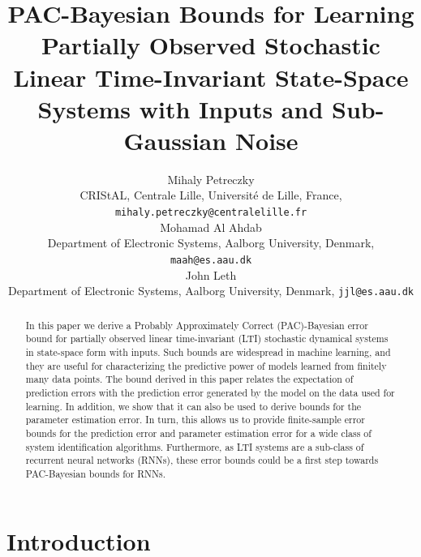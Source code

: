 \documentclass{article}
\title{PAC-Bayesian Bounds for Learning Partially Observed Stochastic Linear Time-Invariant State-Space Systems with Inputs and Sub-Gaussian Noise}
\author{
Mihaly Petreczky \\
CRIStAL, Centrale Lille, Université de Lille, France, \texttt{mihaly.petreczky@centralelille.fr} \\
\And
Mohamad Al Ahdab \\
Department of Electronic Systems, Aalborg University, Denmark, \texttt{maah@es.aau.dk} \\
\And
John Leth \\
Department of Electronic Systems, Aalborg University, Denmark, \texttt{jjl@es.aau.dk} \\
}
\begin{document}
\maketitle 

\begin{abstract}
In this paper we derive a Probably Approximately Correct (PAC)-Bayesian error bound for partially observed linear time-invariant (LTI) stochastic dynamical systems in state-space form with inputs.  Such bounds
are widespread in machine learning, and they are useful for characterizing the predictive power of models learned from  
finitely many data points.  
The bound derived in this paper relates the expectation of prediction errors with the prediction error generated by the model on the data used for learning. In addition, we show that it can also be used to derive bounds for the parameter estimation error.
In turn, this allows us to provide finite-sample error bounds  for the prediction error and parameter estimation error for
a wide class of system identification algorithms. 
Furthermore, as LTI systems are a sub-class of recurrent neural
networks (RNNs), these error bounds could be a first step towards 
PAC-Bayesian bounds for RNNs. 
\end{abstract}

\section{Introduction}
\end{document}
